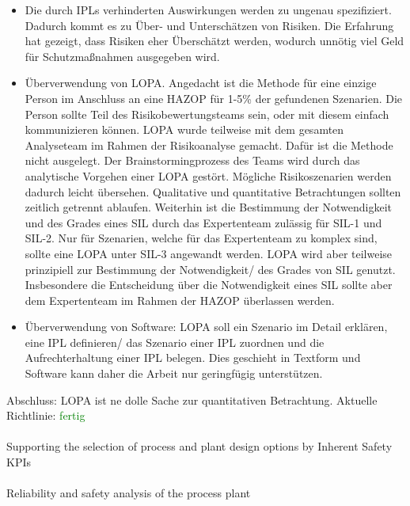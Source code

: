 \begin{itemize}
\begin{itemize}
  \item Die durch IPLs verhinderten Auswirkungen werden zu ungenau spezifiziert. Dadurch kommt es zu \"Uber- und Untersch\"atzen von Risiken. Die Erfahrung hat gezeigt, dass Risiken eher \"Ubersch\"atzt werden, wodurch unn\"otig viel Geld f\"ur Schutzma\ss{}nahmen ausgegeben wird.  
  \item \"Uberverwendung von LOPA. Angedacht ist die Methode f\"ur eine einzige Person im Anschluss an eine HAZOP f\"ur 1-5\% der gefundenen Szenarien. Die Person sollte Teil des Risikobewertungsteams sein, oder mit diesem einfach kommunizieren k\"onnen. LOPA wurde teilweise mit dem gesamten Analyseteam im Rahmen der Risikoanalyse gemacht. Daf\"ur ist die Methode nicht ausgelegt. Der Brainstormingprozess des Teams wird durch das analytische Vorgehen einer LOPA gest\"ort. M\"ogliche Risikoszenarien werden dadurch leicht \"ubersehen. Qualitative und quantitative Betrachtungen sollten zeitlich getrennt ablaufen. Weiterhin ist die Bestimmung der Notwendigkeit und des Grades eines SIL durch das Expertenteam zul\"assig f\"ur SIL-1 und SIL-2.  Nur f\"ur Szenarien, welche f\"ur das Expertenteam zu komplex sind, sollte eine LOPA unter SIL-3 angewandt werden. LOPA wird aber teilweise prinzipiell zur Bestimmung der Notwendigkeit/ des Grades von SIL genutzt. Insbesondere die Entscheidung \"uber die Notwendigkeit eines SIL sollte aber dem Expertenteam im Rahmen der HAZOP \"uberlassen werden.
  \item \"Uberverwendung von Software: LOPA soll ein Szenario im Detail erkl\"aren, eine IPL definieren/ das Szenario einer IPL zuordnen und die Aufrechterhaltung einer IPL belegen. Dies geschieht in Textform und Software kann daher die Arbeit nur geringf\"ugig unterst\"utzen. 
\end{itemize}
\end{itemize}
Abschluss: LOPA ist ne dolle Sache zur quantitativen Betrachtung. Aktuelle Richtlinie: \cite{ChemicalProcessSafety_2015}
\textcolor{green}{fertig}

\paragraph*{\cite{Tugnoli_2012}} Supporting the selection of process and plant design options by Inherent Safety {KPIs}

\paragraph*{\cite{Savkovic_2010}} Reliability and safety analysis of the process plant
 
